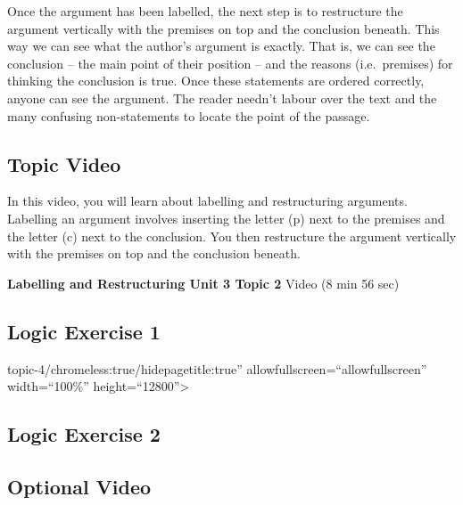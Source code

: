 \documentclass[
]{book}
\begin{document}
Once the argument has been labelled, the next step is to restructure the argument vertically with the premises on top and the conclusion beneath. This way we can see what the author's argument is exactly. That is, we can see the conclusion -- the main point of their position -- and the reasons (i.e.~premises) for thinking the conclusion is true. Once these statements are ordered correctly, anyone can see the argument. The reader needn't labour over the text and the many confusing non-statements to locate the point of the passage.

\hypertarget{topic-video-9}{%
\subsection*{Topic Video}\label{topic-video-9}}

In this video, you will learn about labelling and restructuring arguments. Labelling an argument involves inserting the letter (p) next to the premises and the letter (c) next to the conclusion. You then restructure the argument vertically with the premises on top and the conclusion beneath.

\textbf{Labelling and Restructuring Unit 3 Topic 2} Video (8 min 56 sec)

\hypertarget{logic-exercise-1-1}{%
\subsection*{Logic Exercise 1}\label{logic-exercise-1-1}}

\begin{reflect}
topic-4/chromeless:true/hidepagetitle:true'' allowfullscreen=``allowfullscreen'' width=``100\%'' height=``12800''\textgreater{}
\end{reflect}

\hypertarget{logic-exercise-2-1}{%
\subsection*{Logic Exercise 2}\label{logic-exercise-2-1}}

\begin{reflect}
\end{reflect}

\hypertarget{optional-video-9}{%
\subsection*{Optional Video}\label{optional-video-9}}
\end{document}
